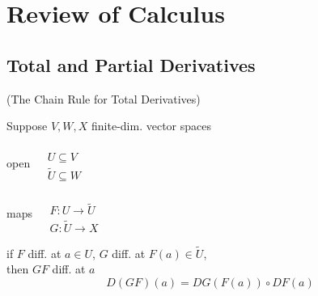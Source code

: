 %                                               
%                                                              
%

\section{Review of Calculus}

\subsection*{Total and Partial Derivatives}

\begin{proposition}[C.3] (The Chain Rule for Total Derivatives)

Suppose $V,W,X$ finite-dim. vector spaces

open $\begin{aligned}
  & \quad \\ 
  & U \subseteq V \\
  & \widetilde{U} \subseteq W \end{aligned}$

maps $\begin{aligned}
  & \quad \\
  & F : U \to \widetilde{U} \\
  & G: \widetilde{U} \to X \end{aligned}$

if $F$ diff. at $a\in U$, $G$ diff. at $F(a) \in \widetilde{U}$, \\
\phantom{ \quad } then $GF$ diff. at $a$
\[
D(GF)(a) = DG(F(a)) \circ DF(a)
\]
\end{proposition}

